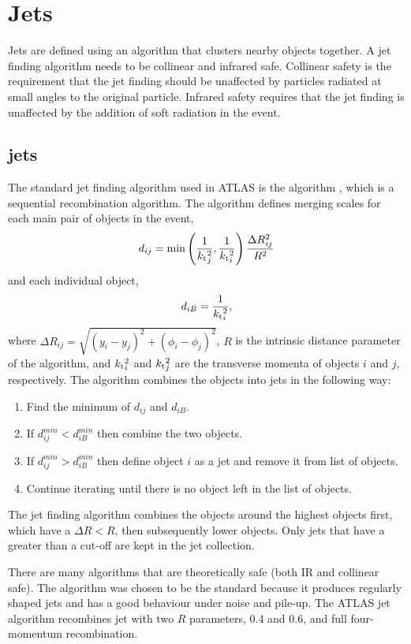 \section{Jets}
\label{sec:Theory:Jets}

Jets are defined using an algorithm that clusters nearby objects together.
A jet finding algorithm needs to be collinear and infrared safe. 
Collinear safety is the requirement that the jet finding should be unaffected by particles radiated at small angles to the original particle. 
Infrared safety requires that the jet finding is unaffected by the addition of soft radiation in the event.  


\subsection{\Antikt{} jets}

The standard jet finding algorithm used in ATLAS is the \antikt{} algorithm \cite{ref:antiKt}, which is a sequential recombination algorithm.
The algorithm defines merging scales for each  main pair of objects in the event, 
\begin{equation}
d_{ij} = \min\left( \frac{1}{\mbox{$k_{\rm t}$}{}_j^2},\frac{1}{\mbox{$k_{\rm t}$}{}_i^2}\right) \frac{\Delta R_{ij}^2}{R^2}
\label{Theory:dij}
\end{equation}
and each individual object, 
\begin{equation}
d_{iB} = \frac{1}{\mbox{$k_{\rm t}$}{}_i^2},
\label{Theory:diB}
\end{equation}
where $\Delta R_{ij}=\sqrt{(y_{i} - y_{j})^2+(\phi_{i} - \phi_{j})^2}$, $R$ is the intrinsic distance parameter of the algorithm, and $\mbox{$k_{\rm t}$}{}_i^2$ and $\mbox{$k_{\rm t}$}{}_j^2$ are the transverse momenta of objects $i$ and $j$, respectively. 
The algorithm combines the objects into jets in the following way:
\begin{enumerate}
\item Find the minimum of $d_{ij}$ and $d_{iB}$.
\item If $d_{ij}^{min} < d_{iB}^{min}$ then combine the two objects.
\item If $d_{ij}^{min} > d_{iB}^{min}$ then define object $i$ as a jet and remove it from list of objects.
\item Continue iterating until there is no object left in the list of objects. 
\end{enumerate}
The \antikt{} jet finding algorithm combines the objects around the highest \pt{} objects first, which have a  $\Delta R  < R$, then subsequently lower \pt{} objects.
Only jets that have a \pt{} greater than a \pt{} cut-off are kept in the jet collection. 

There are many algorithms that are theoretically safe (both IR and collinear safe).
The \antikt{} algorithm was chosen to be the standard because it produces regularly shaped jets and has a good behaviour under noise and pile-up. 
The ATLAS jet algorithm recombines jet with two $R$ parameters, 0.4 and 0.6, and full four-momentum recombination.
